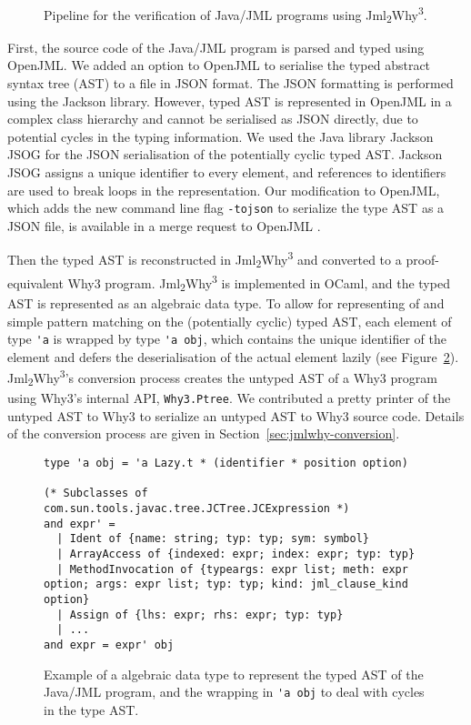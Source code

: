 \documentclass[a4paper]{report}
\newcommand{\jmlwhy}{\texorpdfstring{Jml\textsubscript{2}Why\textsuperscript{3}}{Jml2Why3}}
\begin{document}
\begin{figure}[tb]
  \centering
  
  \caption{Pipeline for the verification of Java/JML programs using \jmlwhy{}.}
  \label{fig:pipeline}
\end{figure}

First, the source code of the Java/JML program is parsed and typed using
OpenJML. We added an option to OpenJML to serialise the typed abstract syntax
tree (AST) to a file in JSON format. The JSON formatting is performed using the
Jackson library. However, typed AST is represented in OpenJML in a complex class
hierarchy and cannot be serialised as JSON directly, due to potential cycles in
the typing information. We used the Java library Jackson JSOG for the JSON
serialisation of the potentially cyclic typed AST. Jackson JSOG assigns a unique
identifier to every element, and references to identifiers are used to break
loops in the representation. Our modification to OpenJML, which adds the new
command line flag \texttt{-tojson} to serialize the type AST as a JSON file, is
available in a merge request to OpenJML \cite{openjml-tojson-pr}.

Then the typed AST is reconstructed in \jmlwhy{} and converted to a
proof-equivalent Why3 program. \jmlwhy{} is implemented in OCaml, and the typed
AST is represented as an algebraic data type. To allow for representing of and
simple pattern matching on the (potentially cyclic) typed AST, each element of
type \lstinline{'a} is wrapped by type \lstinline{'a obj}, which contains the
unique identifier of the element and defers the deserialisation of the actual
element lazily (see Figure~\ref{fig:typedast}). \jmlwhy's conversion process
creates the untyped AST of a Why3 program using Why3's internal API,
\texttt{Why3.Ptree}. We contributed a pretty printer of the untyped AST to Why3
to serialize an untyped AST to Why3 source code. Details of the conversion
process are given in Section~\ref{sec:jmlwhy-conversion}.

\begin{figure}[b]
\begin{lstlisting}
type 'a obj = 'a Lazy.t * (identifier * position option)

(* Subclasses of com.sun.tools.javac.tree.JCTree.JCExpression *)
and expr' =
  | Ident of {name: string; typ: typ; sym: symbol}
  | ArrayAccess of {indexed: expr; index: expr; typ: typ}
  | MethodInvocation of {typeargs: expr list; meth: expr option; args: expr list; typ: typ; kind: jml_clause_kind option}
  | Assign of {lhs: expr; rhs: expr; typ: typ}
  | ...
and expr = expr' obj
\end{lstlisting}
  \caption{Example of a algebraic data type to represent the typed AST of the
    Java/JML program, and the wrapping in \lstinline{'a obj} to deal with cycles
    in the type AST.}
  \label{fig:typedast}
\end{figure}
\end{document}
